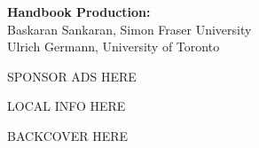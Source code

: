 \documentclass[twoside,makeidx]{book}
\begin{document}
\fancyfoot[C]{}
 
\fancyfoot[C]{\thepage}

\thispagestyle{empty}
\mbox{}

\vfill
\begin{center}
{\bfseries Handbook Production:}\\ 
Baskaran Sankaran, Simon Fraser University\\  
Ulrich Germann, University of Toronto
\end{center}
\newpage

\frontmatter

\clearpage

\clearpage%
\setheaders{}{}
 
\clearpage
% 
SPONSOR ADS HERE
\clearpage%
\setheaders{}{}

\setcounter{tocdepth}{2}
\tableofcontents

\mainmatter
\pagestyle{fancy}
LOCAL INFO HERE
%
\clearpage

 
 
 


\cleardoublepage
{}
\printindex
\pagestyle{emptyheader}
\clearpage{\thispagestyle{emptyheader}\cleardoublepage}
BACKCOVER HERE
%
\end{document}
